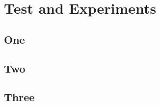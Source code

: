 
\chapter{Test and Experiments}
\begin{spacing}{1.5}
\setlength{\parskip}{0.3in}

\section{One}

\section{Two}

\section{Three}


\end{spacing}
\newpage
